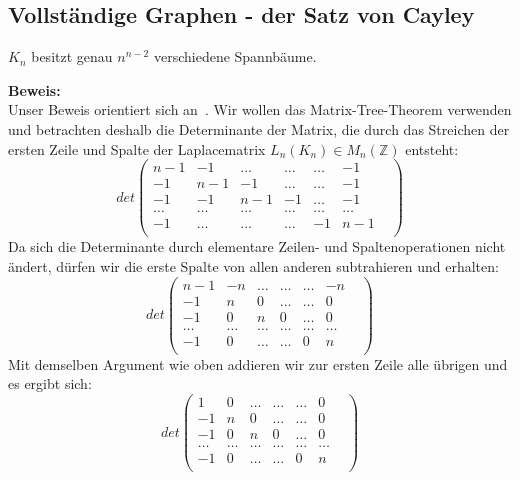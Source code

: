 \subsection{Vollständige Graphen - der Satz von Cayley}
\begin{Tms}
$K_n$ besitzt genau $n^{n-2}$ verschiedene Spannbäume.\\
\end{Tms}
\textbf{Beweis:}\\
Unser Beweis orientiert sich an~\cite{Lau_2004}. Wir wollen das Matrix-Tree-Theorem verwenden und betrachten deshalb die Determinante der Matrix, die durch das Streichen der ersten Zeile und Spalte der Laplacematrix $L_n(K_n)\in M_n(\mathbb{Z})$ entsteht:
\begin{equation}
det
\begin{pmatrix}
n-1&-1&\ldots&\ldots&\ldots&-1\\
-1&n-1&-1&\ldots&\ldots&-1\\
-1&-1&n-1&-1&\ldots&-1\\
\ldots&\ldots&\ldots&\ldots&\ldots&\ldots&\\
-1&\ldots&\ldots&\ldots&-1&n-1\\
\end{pmatrix}
\end{equation}
Da sich die Determinante durch elementare Zeilen- und Spaltenoperationen nicht ändert, dürfen wir die erste Spalte von allen anderen subtrahieren und erhalten:
\begin{equation}det
\begin{pmatrix}
n-1&-n&\ldots&\ldots&\ldots&-n\\
-1&n&0&\ldots&\ldots&0\\
-1&0&n&0&\ldots&0\\
\ldots&\ldots&\ldots&\ldots&\ldots&\ldots&\\
-1&0&\ldots&\ldots&0&n\\
\end{pmatrix}
\end{equation}
Mit demselben Argument wie oben addieren wir zur ersten Zeile alle übrigen und es ergibt sich:
\begin{equation}
det
\begin{pmatrix}
1&0&\ldots&\ldots&\ldots&0\\
-1&n&0&\ldots&\ldots&0\\
-1&0&n&0&\ldots&0\\
\ldots&\ldots&\ldots&\ldots&\ldots&\ldots&\\
-1&0&\ldots&\ldots&0&n\\
\end{pmatrix}
\end{equation}
